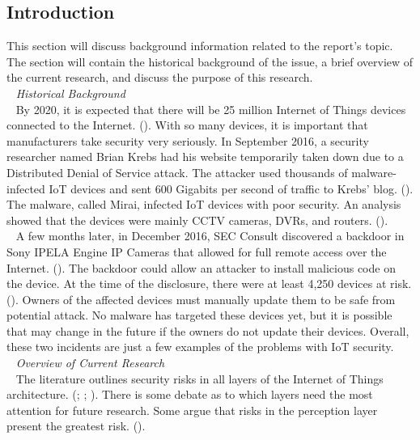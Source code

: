 \documentclass[letterpaper, 12pt]{article}
\begin{document}
\begin{flushleft}
\section*{Introduction}
This section will discuss background information related to the report's topic. The section will contain the historical background of the issue, a brief
overview of the current research, and discuss the purpose of this research. \\
~\newline
\textit{Historical Background}\\ 
~\newline
By 2020, it is expected that there will be 
25 million Internet of Things devices connected to the Internet. (\cite{Martinez1}). With so many devices, it is important that manufacturers take security very seriously. 
In September 2016, a security researcher named Brian Krebs had his website temporarily taken down due to a Distributed Denial of Service attack. The attacker
used thousands of malware-infected IoT devices and sent 600 Gigabits per second of traffic to Krebs' blog. (\cite{Krebs}). The malware, called Mirai, 
infected IoT devices with poor security. An analysis showed that the devices were mainly CCTV cameras, DVRs, and routers. (\cite{Incapsula}).\\
~\newline
A few months later, in December 2016, SEC Consult discovered a backdoor in Sony IPELA Engine IP Cameras that allowed for full remote access over the Internet. (\cite{sec}). The backdoor could allow an attacker
to install malicious code on the device. At the time of the disclosure, there were at least 4,250 devices at risk. (\cite{Krebs2}). Owners of the affected devices must manually update them
to be safe from potential attack. No malware has targeted these devices yet, but it is possible that may change in the future if the owners do not update their devices. Overall, these two incidents
are just a few examples of the problems with IoT security.\\
~\newline
\textit{Overview of Current Research}\\
~\newline
The literature outlines security risks in all layers of the Internet of Things architecture. (\cite{Xiaohui6643029}; \cite{Zhao6746513}; \cite{Suo6188257}). 
There is some debate as to which layers need the most attention for future research. Some argue that risks in the perception layer present the greatest risk. (\cite{Zhao6746513}).

\end{flushleft}
\end{document}

